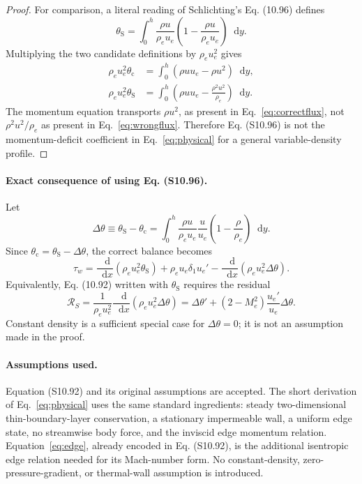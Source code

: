 \documentclass[11pt,a4paper]{article}
\newcommand{\dd}{\mathop{}\!\mathrm{d}}
\newcommand{\rhoe}{\rho_e}
\newcommand{\ue}{u_e}
\newcommand{\taUw}{\tau_w}
\newcommand{\theC}{\theta_{\mathrm c}}
\newcommand{\theS}{\theta_{\mathrm S}}
\begin{document}
\begin{proof}
For comparison, a literal reading of Schlichting's Eq. (10.96) defines
\begin{equation*}
 \theS=\int_0^h\frac{\rho u}{\rhoe\ue}
 \left(1-\frac{\rho u}{\rhoe\ue}\right)\dd y.
 \tag{S10.96}
\end{equation*}
Multiplying the two candidate definitions by $\rhoe\ue^2$ gives
\begin{align}
 \rhoe\ue^2\theC
 &=\int_0^h(\rho u\ue-\rho u^2)\dd y,
 \label{eq:correctflux}\\
 \rhoe\ue^2\theS
 &=\int_0^h\left(\rho u\ue-\frac{\rho^2u^2}{\rhoe}\right)\dd y.
 \label{eq:wrongflux}
\end{align}
The momentum equation transports $\rho u^2$, as present in
Eq.~\eqref{eq:correctflux}, not $\rho^2u^2/\rhoe$ as present in
Eq.~\eqref{eq:wrongflux}. Therefore Eq. (S10.96) is not the momentum-deficit
coefficient in Eq.~\eqref{eq:physical} for a general variable-density profile.
\end{proof}

\paragraph{Exact consequence of using Eq. (S10.96).}
Let
\begin{equation}
 \Delta\theta\equiv\theS-\theC
 =\int_0^h\frac{\rho u}{\rhoe\ue}\frac{u}{\ue}
 \left(1-\frac{\rho}{\rhoe}\right)\dd y.
 \label{eq:difference}
\end{equation}
Since $\theC=\theS-\Delta\theta$, the correct balance becomes
\begin{equation}
 \taUw=\frac{\dd}{\dd x}(\rhoe\ue^2\theS)
 +\rhoe\ue\delta_1\ue'
 -\frac{\dd}{\dd x}(\rhoe\ue^2\Delta\theta).
 \label{eq:corrected}
\end{equation}
Equivalently, Eq. (10.92) written with $\theS$ requires the residual
\begin{equation}
 \boxed{\displaystyle
 \mathcal R_S=\frac{1}{\rhoe\ue^2}
 \frac{\dd}{\dd x}(\rhoe\ue^2\Delta\theta)
 =\Delta\theta'+(2-M_e^2)\frac{\ue'}{\ue}\Delta\theta.}
 \label{eq:residual}
\end{equation}
Constant density is a sufficient special case for $\Delta\theta=0$; it is not
an assumption made in the proof.

\paragraph{Assumptions used.}
Equation (S10.92) and its original assumptions are accepted. The short
derivation of Eq.~\eqref{eq:physical} uses the same standard ingredients:
steady two-dimensional thin-boundary-layer conservation, a stationary
impermeable wall, a uniform edge state, no streamwise body force, and the
inviscid edge momentum relation. Equation~\eqref{eq:edge}, already encoded in
Eq. (S10.92), is the additional isentropic edge relation needed for its
Mach-number form. No constant-density, zero-pressure-gradient, or thermal-wall
assumption is introduced.
\end{document}
